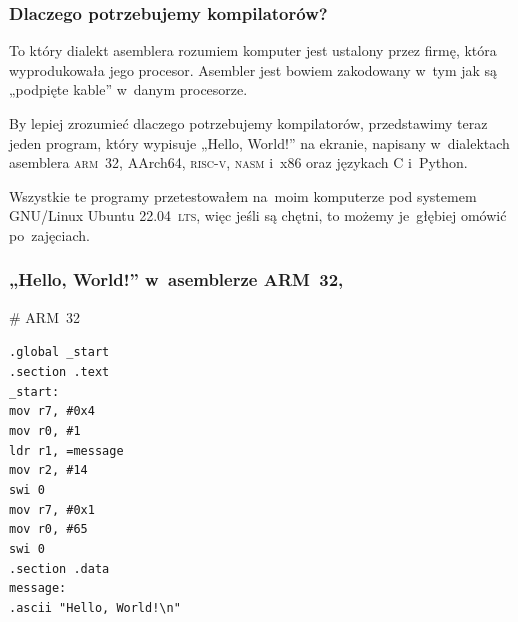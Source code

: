 \documentclass[10pt,t]{beamer}
\begin{document}
\begin{frame}
  \frametitle{Dlaczego potrzebujemy kompilatorów?}


  To który dialekt asemblera rozumiem komputer jest ustalony przez firmę,
  która wyprodukowała jego procesor. Asembler jest bowiem zakodowany w~tym
  jak są „podpięte kable” w~danym procesorze.

  By lepiej zrozumieć dlaczego potrzebujemy kompilatorów, przedstawimy
  teraz jeden program, który wypisuje „Hello, World!” na ekranie, napisany
  w~dialektach asemblera \textsc{arm~32}, AArch64, \textsc{risc-v},
  \textsc{nasm} i~x86 oraz językach C i~Python.

  Wszystkie te programy przetestowałem na~moim komputerze pod systemem
  GNU/Linux Ubuntu 22.04~\textsc{lts}, więc jeśli są chętni, to możemy
  je~głębiej omówić po~zajęciach.

\end{frame}





\begin{frame}
  \frametitle{„Hello, World!” w~asemblerze ARM~32,
    \parencite{Low-Level-Learning-You-Can-Learn-ARM-ETC-Ver-2020}}


  \# ARM~32

  \texttt{.global \_start} \\
  \texttt{.section .text} \\



  \texttt{\_start:} \\[-0.2em]
  \hphantom{aaaaaaaa} \texttt{mov r7, \#0x4} \\
  \hphantom{aaaaaaaa} \texttt{mov r0, \#1} \\
  \hphantom{aaaaaaaa} \texttt{ldr r1, =message} \\
  \hphantom{aaaaaaaa} \texttt{mov r2, \#14} \\

  \hphantom{aaaaaaaa} \texttt{swi 0} \\

  \hphantom{aaaaaaaa} \texttt{mov r7, \#0x1} \\
  \hphantom{aaaaaaaa} \texttt{mov r0, \#65} \\

  \hphantom{aaaaaaaa} \texttt{swi 0} \\



  \texttt{.section .data} \\
  \texttt{message:} \\
  \hphantom{aaaaaaaa} \texttt{.ascii "Hello, World!\textbackslash n"}

\end{frame}
\end{document}
